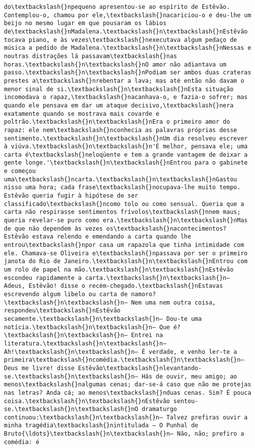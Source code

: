\begin{Verbatim}[commandchars=\\\{\}]
do\textbackslash{}npequeno apresentou-se ao espírito de Estêvão. Contemplou-o, chamou por ele,\textbackslash{}nacariciou-o e deu-lhe um beijo no mesmo lugar em que pousaram os lábios de\textbackslash{}nMadalena.\textbackslash{}n\textbackslash{}nEstêvão tocava piano, e às vezes\textbackslash{}nexecutava algum pedaço de música a pedido de Madalena.\textbackslash{}n\textbackslash{}nNessas e noutras distrações lá passavam\textbackslash{}nas horas.\textbackslash{}n\textbackslash{}nO amor não adiantava um passo.\textbackslash{}n\textbackslash{}nPodiam ser ambos duas crateras prestes a\textbackslash{}nrebentar a lava; mas até então não davam o menor sinal de si.\textbackslash{}n\textbackslash{}nEsta situação incomodava o rapaz,\textbackslash{}nacanhava-o, e fazia-o sofrer; mas quando ele pensava em dar um ataque decisivo,\textbackslash{}nera exatamente quando se mostrava mais covarde e poltrão.\textbackslash{}n\textbackslash{}nEra o primeiro amor do rapaz: ele nem\textbackslash{}nconhecia as palavras próprias desse sentimento.\textbackslash{}n\textbackslash{}nUm dia resolveu escrever à viúva.\textbackslash{}n\textbackslash{}n'É melhor, pensava ele; uma carta é\textbackslash{}neloqüente e tem a grande vantagem de deixar a gente longe.'\textbackslash{}n\textbackslash{}nEntrou para o gabinete e começou uma\textbackslash{}ncarta.\textbackslash{}n\textbackslash{}nGastou nisso uma hora; cada frase\textbackslash{}nocupava-lhe muito tempo. Estêvão queria fugir à hipótese de ser classificado\textbackslash{}ncomo tolo ou como sensual. Queria que a carta não respirasse sentimentos frívolos\textbackslash{}nnem maus; queria revelar-se puro como era.\textbackslash{}n\textbackslash{}nMas de que não dependem às vezes os\textbackslash{}nacontecimentos? Estêvão estava relendo e emendando a carta quando lhe entrou\textbackslash{}npor casa um rapazola que tinha intimidade com ele. Chamava-se Oliveira e\textbackslash{}npassava por ser o primeiro janota do Rio de Janeiro.\textbackslash{}n\textbackslash{}nEntrou com um rolo de papel na mão.\textbackslash{}n\textbackslash{}nEstêvão escondeu rapidamente a carta.\textbackslash{}n\textbackslash{}n— Adeus, Estêvão! disse o recém-chegado.\textbackslash{}nEstavas escrevendo algum libelo ou carta de namoro?\textbackslash{}n\textbackslash{}n— Nem uma nem outra coisa, respondeu\textbackslash{}nEstêvão secamente.\textbackslash{}n\textbackslash{}n— Dou-te uma notícia.\textbackslash{}n\textbackslash{}n— Que é?\textbackslash{}n\textbackslash{}n— Entrei na literatura.\textbackslash{}n\textbackslash{}n— Ah!\textbackslash{}n\textbackslash{}n— É verdade, e venho ler-te a primeira\textbackslash{}ncomédia.\textbackslash{}n\textbackslash{}n— Deus me livre! disse Estêvão\textbackslash{}nlevantando-se.\textbackslash{}n\textbackslash{}n— Hás de ouvir, meu amigo; ao menos\textbackslash{}nalgumas cenas; dar-se-á caso que não me protejas nas letras? Anda cá; ao menos\textbackslash{}nduas cenas. Sim? É pouca coisa.\textbackslash{}n\textbackslash{}nEstêvão sentou-se.\textbackslash{}n\textbackslash{}nO dramaturgo continuou:\textbackslash{}n\textbackslash{}n— Talvez prefiras ouvir a minha tragédia\textbackslash{}nintitulada — O Punhal de Bruto{\ldots}\textbackslash{}n\textbackslash{}n— Não, não; prefiro a comédia: é 
\end{Verbatim}
